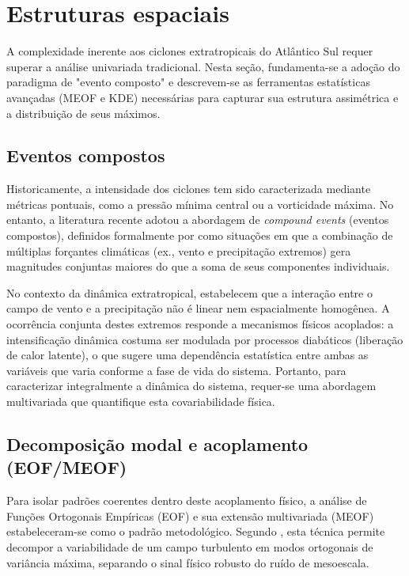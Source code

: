 \section{Estruturas espaciais}\label{sec:mt_compuestos}

A complexidade inerente aos ciclones extratropicais do Atlântico Sul requer superar a análise univariada tradicional. Nesta seção, fundamenta-se a adoção do paradigma de "evento composto" e descrevem-se as ferramentas estatísticas avançadas (MEOF e KDE) necessárias para capturar sua estrutura assimétrica e a distribuição de seus máximos.

\subsection{Eventos compostos}\label{subsec:mt_compound_def}
Historicamente, a intensidade dos ciclones tem sido caracterizada mediante métricas pontuais, como a pressão mínima central ou a vorticidade máxima. No entanto, a literatura recente adotou a abordagem de \textit{compound events} (eventos compostos), definidos formalmente por \citet{zscheischler2018future} como situações em que a combinação de múltiplas forçantes climáticas (ex., vento e precipitação extremos) gera magnitudes conjuntas maiores do que a soma de seus componentes individuais.

No contexto da dinâmica extratropical, \citet{chen2025characteristics} estabelecem que a interação entre o campo de vento e a precipitação não é linear nem espacialmente homogênea. A ocorrência conjunta destes extremos responde a mecanismos físicos acoplados: a intensificação dinâmica costuma ser modulada por processos diabáticos (liberação de calor latente), o que sugere uma dependência estatística entre ambas as variáveis que varia conforme a fase de vida do sistema. Portanto, para caracterizar integralmente a dinâmica do sistema, requer-se uma abordagem multivariada que quantifique esta covariabilidade física.

\subsection{Decomposição modal e acoplamento (EOF/MEOF)}\label{subsec:mt_math_meof}
Para isolar padrões coerentes dentro deste acoplamento físico, a análise de Funções Ortogonais Empíricas (EOF) e sua extensão multivariada (MEOF) estabeleceram-se como o padrão metodológico. Segundo \citet{hannachi2007empirical}, esta técnica permite decompor a variabilidade de um campo turbulento em modos ortogonais de variância máxima, separando o sinal físico robusto do ruído de mesoescala.

